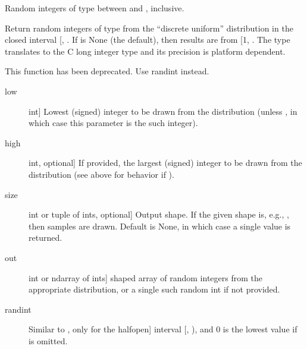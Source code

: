 \documentclass[letterpaper,10pt,english]{sphinxmanual}
\begin{document}
\begin{fulllineitems}
\label{\detokenize{infrapy.utils:infrapy.utils.ref2sac.random_integers}}
Random integers of type  between  and , inclusive.

Return random integers of type  from the “discrete uniform”
distribution in the closed interval {[}, \sphinxtitleref{high}{]}.  If  is
None (the default), then results are from {[}1, \sphinxtitleref{low}{]}. The 
type translates to the C long integer type and its precision
is platform dependent.

This function has been deprecated. Use randint instead.

\begin{description}
\item[{low}] \leavevmode{[}int{]}
Lowest (signed) integer to be drawn from the distribution (unless
, in which case this parameter is the  such
integer).

\item[{high}] \leavevmode{[}int, optional{]}
If provided, the largest (signed) integer to be drawn from the
distribution (see above for behavior if ).

\item[{size}] \leavevmode{[}int or tuple of ints, optional{]}
Output shape.  If the given shape is, e.g., , then
 samples are drawn.  Default is None, in which case a
single value is returned.

\end{description}
\begin{description}
\item[{out}] \leavevmode{[}int or ndarray of ints{]}
\sphinxhyphen{}shaped array of random integers from the appropriate
distribution, or a single such random int if  not provided.

\end{description}
\begin{description}
\item[{randint}] \leavevmode{[}Similar to , only for the half\sphinxhyphen{}open{]}
interval {[}, ), and 0 is the lowest value if  is
omitted.


\end{description}
\end{fulllineitems}
\end{document}
